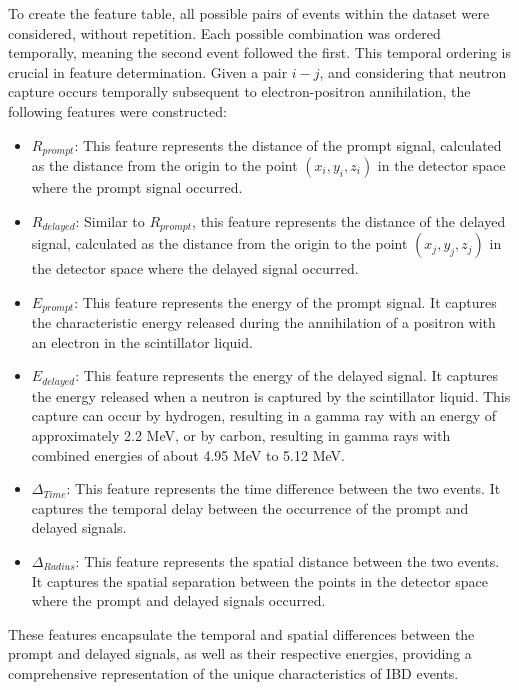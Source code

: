 To create the feature table, all possible pairs of events within the dataset were considered, without repetition. Each possible combination was ordered temporally, meaning the second event followed the first. This temporal ordering is crucial in feature determination. Given a pair $i-j$, and considering that neutron capture occurs temporally subsequent to electron-positron annihilation, the following features were constructed:


\begin{itemize}
	 
	\item \textbf{$R_{prompt}$}: This feature represents the distance of the prompt signal, calculated as the distance from the origin to the point $(x_i, y_i, z_i)$ in the detector space where the prompt signal occurred.	
	
	\item $R_{delayed}$: Similar to $R_{prompt}$, this feature represents the distance of the delayed signal, calculated as the distance from the origin to the point $(x_j, y_j, z_j)$ in the detector space where the delayed signal occurred.

	\item \textbf{$E_{prompt}$}: This feature represents the energy of the prompt signal. It captures the characteristic energy released during the annihilation of a positron with an electron in the scintillator liquid.

	\item \textbf{$E_{delayed}$}: This feature represents the energy of the delayed signal. It captures the energy released when a neutron is captured by the scintillator liquid. This capture can occur by hydrogen, resulting in a gamma ray with an energy of approximately 2.2 MeV, or by carbon, resulting in gamma rays with combined energies of about 4.95 MeV to 5.12 MeV.

	\item \textbf{$\Delta_{Time}$}: This feature represents the time difference between the two events. It captures the temporal delay between the occurrence of the prompt and delayed signals.

	\item \textbf{$\Delta_{Radius}$}: This feature represents the spatial distance between the two events. It captures the spatial separation between the points in the detector space where the prompt and delayed signals occurred.

\end{itemize}
These features encapsulate the temporal and spatial differences between the prompt and delayed signals, as well as their respective energies, providing a comprehensive representation of the unique characteristics of IBD events.


